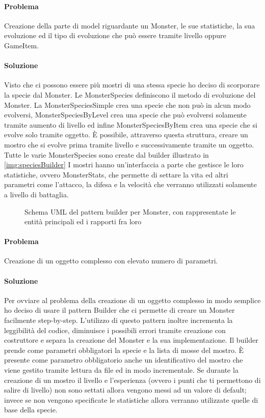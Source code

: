 \paragraph{Problema}
Creazione della parte di model riguardante un Monster, le sue statistiche, la sua evoluzione ed il tipo di evoluzione che può essere tramite livello oppure GameItem.

\paragraph{Soluzione}
Visto che ci possono essere più mostri di una stessa specie ho deciso di scorporare la specie dal Monster. Le MonsterSpecies definiscono il metodo di evoluzione del Monster. La MonsterSpeciesSimple crea una specie che non può in alcun modo evolversi, MonsterSpeciesByLevel crea una specie che può evolversi solamente tramite aumento di livello ed infine MonsterSpeciesByItem crea una specie che si evolve solo tramite oggetto. È possibile, attraverso questa struttura, creare un mostro che si evolve prima tramite livello e successivamente tramite un oggetto.
Tutte le varie MonsterSpecies sono create dal builder illustrato in \cref{img:speciesBuilder}
I mostri hanno un'interfaccia a parte che gestisce le loro statistiche, ovvero MonsterStats, che permette di settare la vita ed altri parametri come l'attacco, la difesa e la velocità che verranno utilizzati solamente a livello di battaglia.

\begin{figure}[H]
\centering

\caption{Schema UML del pattern builder per Monster, con rappresentate le entità principali ed i rapporti fra loro}
\label{img:monsterBuilder}
\end{figure}

\paragraph{Problema}
Creazione di un oggetto complesso con elevato numero di parametri.

\paragraph{Soluzione}
Per ovviare al problema della creazione di un oggetto complesso in modo semplice ho deciso di usare il pattern Builder che ci permette di creare un Monster facilmente step-by-step.
L'utilizzo di questo pattern inoltre incrementa la leggibilità del codice, diminuisce i possibili errori tramite creazione con costruttore e separa la creazione del Monster e la sua implementazione.
Il builder prende come parametri obbligatori la specie e la lista di mosse del mostro. È presente come parametro obbligatorio anche un identificativo del mostro che viene gestito tramite lettura da file ed in modo incrementale.
Se durante la creazione di un mostro il livello e l'esperienza (ovvero i punti che ti permettono di salire di livello) non sono settati allora vengono messi ad un valore di default; invece se non vengono specificate le statistiche allora verranno utilizzate quelle di base della specie.

